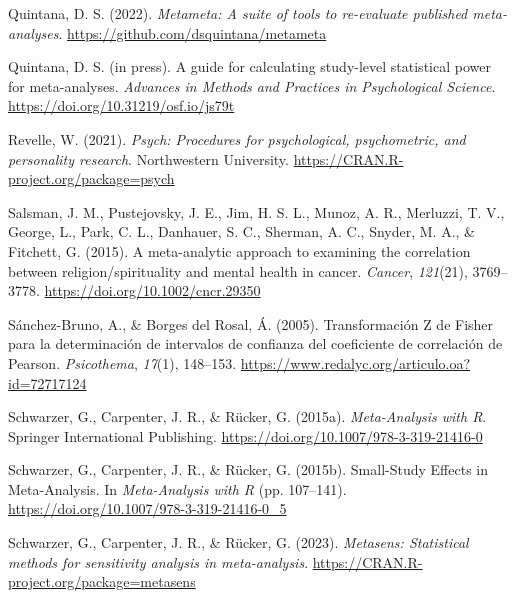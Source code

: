 \documentclass[
  bookmarksnumbered]{article}
\newlength{\cslhangindent}
\newlength{\cslentryspacingunit} %
\newenvironment{CSLReferences}[2] %
 {%
  \setlength{\parindent}{0pt}
  \ifodd #1
  \let\oldpar\par
  \def\par{\hangindent=\cslhangindent\oldpar}
  \fi
  \setlength{\parskip}{#2\cslentryspacingunit}
 }%
 {}
\begin{document}
\begin{CSLReferences}{1}{0}
\leavevmode{}%
Quintana, D. S. (2022). \emph{Metameta: A suite of tools to re-evaluate published meta-analyses}. \url{https://github.com/dsquintana/metameta}

\leavevmode{}%
Quintana, D. S. (in press). A guide for calculating study-level statistical power for meta-analyses. \emph{{Advances in Methods and Practices in Psychological Science}}. \url{https://doi.org/10.31219/osf.io/js79t}

\leavevmode{}%
Revelle, W. (2021). \emph{Psych: Procedures for psychological, psychometric, and personality research}. Northwestern University. \url{https://CRAN.R-project.org/package=psych}

\leavevmode{}%
Salsman, J. M., Pustejovsky, J. E., Jim, H. S. L., Munoz, A. R., Merluzzi, T. V., George, L., Park, C. L., Danhauer, S. C., Sherman, A. C., Snyder, M. A., \& Fitchett, G. (2015). A meta-analytic approach to examining the correlation between religion/spirituality and mental health in cancer. \emph{Cancer}, \emph{121}(21), 3769--3778. \url{https://doi.org/10.1002/cncr.29350}

\leavevmode{}%
Sánchez-Bruno, A., \& Borges del Rosal, Á. (2005). {Transformación Z de Fisher para la determinación de intervalos de confianza del coeficiente de correlación de Pearson}. \emph{Psicothema}, \emph{17}(1), 148--153. \url{https://www.redalyc.org/articulo.oa?id=72717124}

\leavevmode{}%
Schwarzer, G., Carpenter, J. R., \& Rücker, G. (2015a). \emph{Meta-{Analysis} with {R}}. {Springer International Publishing}. \url{https://doi.org/10.1007/978-3-319-21416-0}

\leavevmode{}%
Schwarzer, G., Carpenter, J. R., \& Rücker, G. (2015b). Small-{Study Effects} in {Meta}-{Analysis}. In \emph{Meta-{Analysis} with {R}} (pp. 107--141). \url{https://doi.org/10.1007/978-3-319-21416-0_5}

\leavevmode{}%
Schwarzer, G., Carpenter, J. R., \& Rücker, G. (2023). \emph{Metasens: Statistical methods for sensitivity analysis in meta-analysis}. \url{https://CRAN.R-project.org/package=metasens}


\end{CSLReferences}
\end{document}
